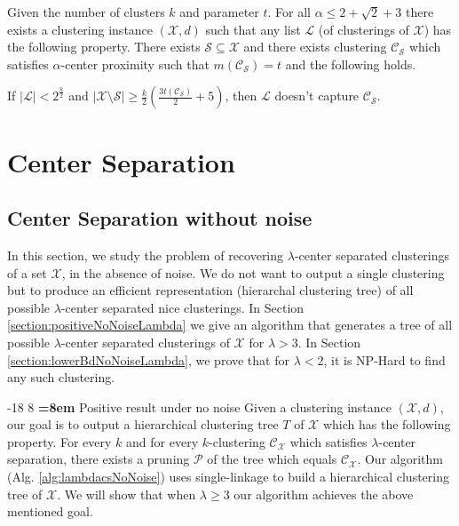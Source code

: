 \documentclass[orivec]{llncs}
\makeatletter
\newcommand{\mc}{\mathcal}
\renewcommand\subsubsection{\@startsection{subsubsection}{3}{\z@}%
   {-18\p@ \@plus -4\p@ \@minus -4\p@}%
   {8\p@ \@plus 4\p@ \@minus 4\p@}%
   {\normalfont\normalsize\bfseries\boldmath
   \rightskip=\z@ \@plus 8em \pretolerance=10000}}
\makeatother
\begin{document}
\begin{theorem}
\label{thm:nosparselistalphacp}
Given the number of clusters $k$ and parameter $t$. For all $\alpha \le 2+\sqrt{2}+3$ there exists a clustering instance $(\mc X, d)$ such that any list $\mc L$ (of clusterings of $\mc X$) has  the following property. There exists $\mc S \subseteq \mc X$ and there exists clustering $\mc C_{\mc S}$ which satisfies $\alpha$-center proximity such that $m(\mc C_{\mc S}) = t$ and the following holds.  

If $|\mc L| < 2^{\frac{k}{2}}$ and $|\mc X \setminus \mc S|\ge \frac{k}{2}(\frac{3t(\mc C_{\mc S})}{2}+5)$, then $\mc L$ doesn't capture $\mc C_{\mc S}$.
\end{theorem}

\section{Center Separation}
\label{sec:cs}
 
\subsection{Center Separation without noise}
\label{sec:cswithout}

In this section, we study the problem of recovering $\lambda$-center separated clusterings of a set $\mc X$, in the absence of noise. We do not want to output a single clustering but to produce an efficient representation (hierarchal clustering tree) of all possible $\lambda$-center separated nice clusterings. In Section \ref{section:positiveNoNoiseLambda} we give an algorithm that generates a tree of all possible $\lambda$-center separated clusterings of $\mc X$ for $\lambda > 3$.  In Section \ref{section:lowerBdNoNoiseLambda}, we prove that for  $\lambda < 2$, it is NP-Hard to find any such clustering.


\subsubsection{Positive result under no noise}
\label{section:positiveNoNoiseLambda}
Given a clustering instance $(\mc X, d)$, our goal is to output a hierarchical clustering tree $T$ of $\mc X$ which has the following property. For every $k$ and for every $k$-clustering $\mc C_{\mc X}$ which satisfies $\lambda$-center separation, there exists a pruning $\mc P$ of the tree which equals $\mc C_{\mc X}$. Our algorithm (Alg. \ref{alg:lambdacsNoNoise}) uses single-linkage to build a hierarchical clustering tree of $\mc X$. We will show that when $\lambda \ge 3$ our algorithm achieves the above mentioned goal. 
\end{document}
